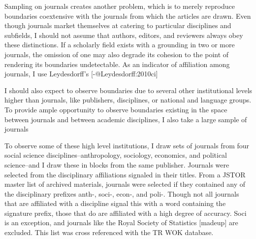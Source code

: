 Sampling on journals creates another problem, which is to merely
reproduce boundaries coextensive with the journals from which the
articles are drawn. Even though journals market themselves at catering
to particular disciplines and subfields, I should not assume that
authors, editors, and reviewers always obey these distinctions. If a
scholarly field exists with a grounding in two or more journals, the
omission of one may also degrade its cohesion to the point of rendering
its boundaries undetectable. As an indicator of affiliation among
journals, I use Leydesdorff's [-@Leydesdorff:2010ci]

I should also expect to observe boundaries due to several other
institutional levels higher than journals, like publishers, disciplines,
or national and language groups. To provide ample opportunity to observe
boundaries existing in the space between journals and between academic
disciplines, I also take a large sample of journals

To observe some of these high level institutions, I draw sets of
journals from four social science disciplines–anthropology, sociology,
economics, and political science–and I draw these in blocks from the
same publisher. Journals were selected from the disciplinary
affiliations signaled in their titles. From a JSTOR master list of
archived materials, journals were selected if they contained any of the
disciplinary prefixes anth-, soci-, econ-, and poli-. {{Though not all
journals that are affiliated with a discipline signal this with a word
containing the signature prefix, those that do are affiliated with a
high degree of accuracy. Soci is an exception, and journals like the
Royal Society of Statistics [madeup] are excluded.}} This list was cross
referenced with the TR WOK database.

